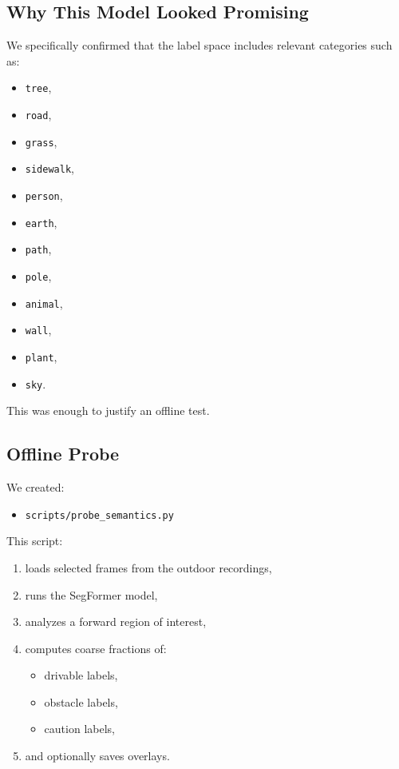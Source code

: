 \documentclass[11pt]{article}
\begin{document}
\subsection{Why This Model Looked Promising}
We specifically confirmed that the label space includes relevant categories such as:
\begin{itemize}[leftmargin=*]
\item \texttt{tree},
\item \texttt{road},
\item \texttt{grass},
\item \texttt{sidewalk},
\item \texttt{person},
\item \texttt{earth},
\item \texttt{path},
\item \texttt{pole},
\item \texttt{animal},
\item \texttt{wall},
\item \texttt{plant},
\item \texttt{sky}.
\end{itemize}

This was enough to justify an offline test.

\subsection{Offline Probe}
We created:
\begin{itemize}[leftmargin=*]
\item \texttt{scripts/probe\_semantics.py}
\end{itemize}

This script:
\begin{enumerate}[leftmargin=*]
\item loads selected frames from the outdoor recordings,
\item runs the SegFormer model,
\item analyzes a forward region of interest,
\item computes coarse fractions of:
  \begin{itemize}[leftmargin=*]
  \item drivable labels,
  \item obstacle labels,
  \item caution labels,
  \end{itemize}
\item and optionally saves overlays.
\end{enumerate}
\end{document}
